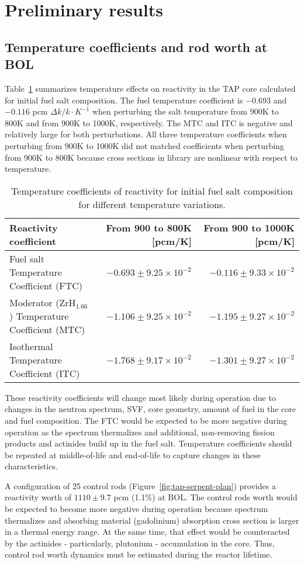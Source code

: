 \section{Preliminary results}

\subsection{Temperature coefficients and rod worth at BOL}
Table~\ref{tab:tcoef} summarizes temperature effects on reactivity in the 
\gls{TAP} core calculated for initial fuel salt composition. The fuel 
temperature coefficient is $-0.693$ and $-0.116$ pcm $\Delta k/k\cdot K^{-1}$ 
when perturbing the salt temperature from 900K to 800K and from 900K to 1000K, 
respectively. The MTC and ITC is negative and relatively large for both 
perturbations. All three temperature coefficients when perturbing from 900K to 
1000K did not matched coefficients when perturbing from 900K to 800K because 
cross sections in library are nonlinear with respect to temperature.

\begin{table}[ht!]
	\caption{Temperature coefficients of reactivity for initial fuel salt 
		composition for different temperature variations.}
	\begin{tabularx}{\textwidth}{ X  r r } \hline
		Reactivity coefficient     & From 900 to 800K [pcm/K] & From 900 to 
		1000K [pcm/K]                  \tabularnewline  \hline
		Fuel salt Temperature Coefficient (FTC) &
		$-0.693\pm9.25\times10^{-2}$ & $-0.116\pm9.33\times10^{-2}$ 
		\tabularnewline \hline
		Moderator (ZrH$_{1.66}$) Temperature Coefficient (MTC) & 
		$-1.106\pm9.25\times10^{-2}$ & $-1.195\pm9.27\times10^{-2}$  
		\tabularnewline \hline
		Isothermal Temperature Coefficient (ITC)  & 
		$-1.768\pm9.17\times10^{-2}$ &  $-1.301\pm9.27\times10^{-2}$  
		\tabularnewline \hline
	\end{tabularx}
	\label{tab:tcoef}
\end{table}
These reactivity coefficients will change most likely during operation due to 
changes in the neutron spectrum, \gls{SVF}, core geometry, amount of fuel in 
the core and fuel composition. The FTC would be expected to be more negative 
during operation as the spectrum thermalizes and additional, non-removing 
fission products and actinides build up in the fuel salt. Temperature 
coefficients should be repeated at middle-of-life and end-of-life to capture 
changes in these characteristics.

A configuration of 25 control rods (Figure~\ref{fig:tap-serpent-plan}) 
provides a reactivity worth of $1110\pm9.7$ pcm (1.1\%) at \gls{BOL}. The 
control rods worth would be expected to become more negative during operation 
because spectrum thermalizes and absorbing material (gadolinium) absorption 
cross section is larger in a thermal energy range. At the same time, that 
effect would be counteracted by the actinides - particularly, plutonium - 
accumulation in the core. Thus, control rod worth dynamics must be estimated 
during the reactor lifetime.
